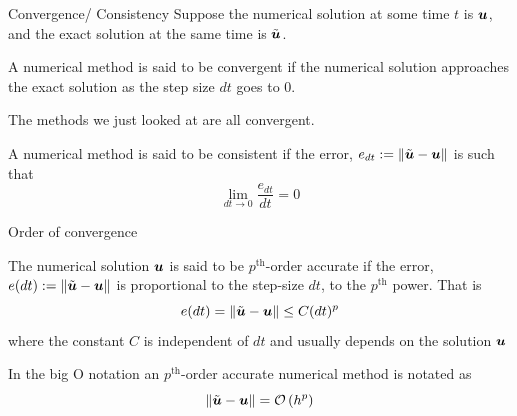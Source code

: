 \documentclass[presentation]{beamer}
\newcommand{\gv}[1]{\ensuremath{\mbox{\boldmath$ #1 $}}}
\newcommand{\order}[1]{\mathcal O \left( #1 \right)} %
\begin{document}
\begin{frame}[label={sec:org3be6b39}]{Convergence/ Consistency}
Suppose the numerical solution at some time \(t\) is \(\gv{u}\), and the
exact solution at the same time is \(\tilde{\gv{u}}\).
\begin{definition}[Convergence]
A numerical method is said to be convergent if the numerical solution
approaches the exact solution as the step size \(dt\) goes to 0.
\end{definition}
The methods we just looked at are all convergent.
\begin{definition}[Consistency]
A numerical method is said to be consistent if the error, \(e_{dt}:=\lVert\tilde{\gv{u}}-\gv{u} \rVert\) is such that
\[ \lim_{dt \to 0} \frac{e_{dt}}{dt} = 0\]
\end{definition}
\end{frame}
\begin{frame}[label={sec:org41b7e89}]{Order of convergence}
\begin{definition}
The numerical solution \(\gv{u}\) is said to be \(p^{\text{th}}\)-order
accurate if the error, \(e(dt):=\lVert\tilde{\gv{u}}-\gv{u} \rVert\)
is proportional to the step-size \(dt\), to the \(p^{\text{th}}\) power. That
is
\[ e(dt)=\lVert\tilde{\gv{u}}-\gv{u} \rVert\leq C(dt)^{p} \]
where the constant \(C\) is independent of \(dt\) and usually depends on
the solution \(\gv{u}\)
\end{definition}
 In the big O notation an \(p^{\text{th}}\)-order accurate numerical method
 is notated as
\[ \lVert\tilde{\gv{u}}-\gv{u} \rVert = \order{h^p}\]
\end{frame}
\end{document}
